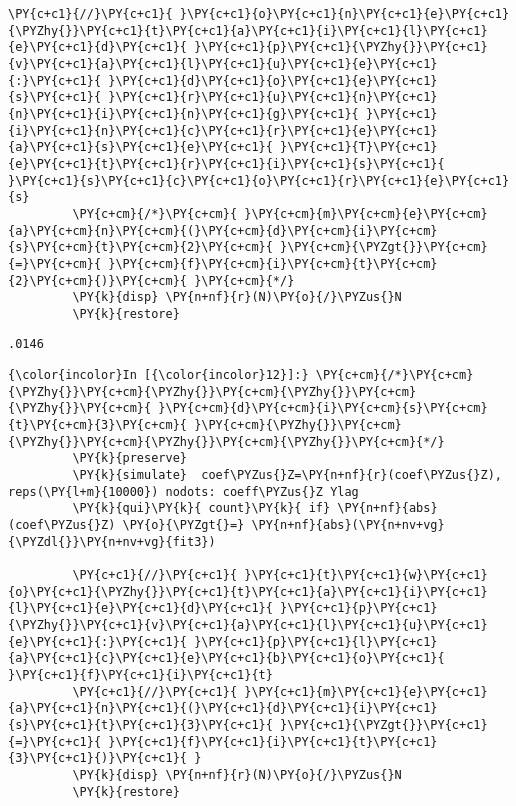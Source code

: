 \documentclass[11pt,notitlepage]{article}\usepackage[]{graphicx}\usepackage[]{color}
\makeatletter
\newenvironment{kframe}{%
 \def\at@end@of@kframe{}%
 \ifinner\ifhmode%
  \def\at@end@of@kframe{\end{minipage}}%
  \begin{minipage}{\columnwidth}%
 \fi\fi%
 \def\FrameCommand##1{\hskip\@totalleftmargin \hskip-\fboxsep
 \colorbox{shadecolor}{##1}\hskip-\fboxsep
     \hskip-\linewidth \hskip-\@totalleftmargin \hskip\columnwidth}%
 \MakeFramed {\advance\hsize-\width
   \@totalleftmargin\z@ \linewidth\hsize
   \@setminipage}}%
 {\par\unskip\endMakeFramed%
 \at@end@of@kframe}
\newenvironment{knitrout}{}{} %
\makeatother
\begin{document}
\begin{enumerate}[a)]
\begin{knitrout}
\begin{kframe}
\begin{Verbatim}[commandchars=\\\{\}]
         \PY{c+c1}{//}\PY{c+c1}{ }\PY{c+c1}{o}\PY{c+c1}{n}\PY{c+c1}{e}\PY{c+c1}{\PYZhy{}}\PY{c+c1}{t}\PY{c+c1}{a}\PY{c+c1}{i}\PY{c+c1}{l}\PY{c+c1}{e}\PY{c+c1}{d}\PY{c+c1}{ }\PY{c+c1}{p}\PY{c+c1}{\PYZhy{}}\PY{c+c1}{v}\PY{c+c1}{a}\PY{c+c1}{l}\PY{c+c1}{u}\PY{c+c1}{e}\PY{c+c1}{:}\PY{c+c1}{ }\PY{c+c1}{d}\PY{c+c1}{o}\PY{c+c1}{e}\PY{c+c1}{s}\PY{c+c1}{ }\PY{c+c1}{r}\PY{c+c1}{u}\PY{c+c1}{n}\PY{c+c1}{n}\PY{c+c1}{i}\PY{c+c1}{n}\PY{c+c1}{g}\PY{c+c1}{ }\PY{c+c1}{i}\PY{c+c1}{n}\PY{c+c1}{c}\PY{c+c1}{r}\PY{c+c1}{e}\PY{c+c1}{a}\PY{c+c1}{s}\PY{c+c1}{e}\PY{c+c1}{ }\PY{c+c1}{T}\PY{c+c1}{e}\PY{c+c1}{t}\PY{c+c1}{r}\PY{c+c1}{i}\PY{c+c1}{s}\PY{c+c1}{ }\PY{c+c1}{s}\PY{c+c1}{c}\PY{c+c1}{o}\PY{c+c1}{r}\PY{c+c1}{e}\PY{c+c1}{s}
         \PY{c+cm}{/*}\PY{c+cm}{ }\PY{c+cm}{m}\PY{c+cm}{e}\PY{c+cm}{a}\PY{c+cm}{n}\PY{c+cm}{(}\PY{c+cm}{d}\PY{c+cm}{i}\PY{c+cm}{s}\PY{c+cm}{t}\PY{c+cm}{2}\PY{c+cm}{ }\PY{c+cm}{\PYZgt{}}\PY{c+cm}{=}\PY{c+cm}{ }\PY{c+cm}{f}\PY{c+cm}{i}\PY{c+cm}{t}\PY{c+cm}{2}\PY{c+cm}{)}\PY{c+cm}{ }\PY{c+cm}{*/}
         \PY{k}{disp} \PY{n+nf}{r}(N)\PY{o}{/}\PYZus{}N
         \PY{k}{restore}
\end{Verbatim}

    \begin{Verbatim}[commandchars=\\\{\}]
.0146
    \end{Verbatim}

    \begin{Verbatim}[commandchars=\\\{\}]
{\color{incolor}In [{\color{incolor}12}]:} \PY{c+cm}{/*}\PY{c+cm}{\PYZhy{}}\PY{c+cm}{\PYZhy{}}\PY{c+cm}{\PYZhy{}}\PY{c+cm}{\PYZhy{}}\PY{c+cm}{ }\PY{c+cm}{d}\PY{c+cm}{i}\PY{c+cm}{s}\PY{c+cm}{t}\PY{c+cm}{3}\PY{c+cm}{ }\PY{c+cm}{\PYZhy{}}\PY{c+cm}{\PYZhy{}}\PY{c+cm}{\PYZhy{}}\PY{c+cm}{\PYZhy{}}\PY{c+cm}{*/}
         \PY{k}{preserve}	
         \PY{k}{simulate}  coef\PYZus{}Z=\PY{n+nf}{r}(coef\PYZus{}Z), reps(\PY{l+m}{10000}) nodots: coeff\PYZus{}Z Ylag
         \PY{k}{qui}\PY{k}{ count}\PY{k}{ if} \PY{n+nf}{abs}(coef\PYZus{}Z) \PY{o}{\PYZgt{}=} \PY{n+nf}{abs}(\PY{n+nv+vg}{\PYZdl{}}\PY{n+nv+vg}{fit3})
         
         \PY{c+c1}{//}\PY{c+c1}{ }\PY{c+c1}{t}\PY{c+c1}{w}\PY{c+c1}{o}\PY{c+c1}{\PYZhy{}}\PY{c+c1}{t}\PY{c+c1}{a}\PY{c+c1}{i}\PY{c+c1}{l}\PY{c+c1}{e}\PY{c+c1}{d}\PY{c+c1}{ }\PY{c+c1}{p}\PY{c+c1}{\PYZhy{}}\PY{c+c1}{v}\PY{c+c1}{a}\PY{c+c1}{l}\PY{c+c1}{u}\PY{c+c1}{e}\PY{c+c1}{:}\PY{c+c1}{ }\PY{c+c1}{p}\PY{c+c1}{l}\PY{c+c1}{a}\PY{c+c1}{c}\PY{c+c1}{e}\PY{c+c1}{b}\PY{c+c1}{o}\PY{c+c1}{ }\PY{c+c1}{f}\PY{c+c1}{i}\PY{c+c1}{t}
         \PY{c+c1}{//}\PY{c+c1}{ }\PY{c+c1}{m}\PY{c+c1}{e}\PY{c+c1}{a}\PY{c+c1}{n}\PY{c+c1}{(}\PY{c+c1}{d}\PY{c+c1}{i}\PY{c+c1}{s}\PY{c+c1}{t}\PY{c+c1}{3}\PY{c+c1}{ }\PY{c+c1}{\PYZgt{}}\PY{c+c1}{=}\PY{c+c1}{ }\PY{c+c1}{f}\PY{c+c1}{i}\PY{c+c1}{t}\PY{c+c1}{3}\PY{c+c1}{)}\PY{c+c1}{ }
         \PY{k}{disp} \PY{n+nf}{r}(N)\PY{o}{/}\PYZus{}N
         \PY{k}{restore}
\end{Verbatim}


\end{kframe}
\end{knitrout}
\end{enumerate}
\end{document}
